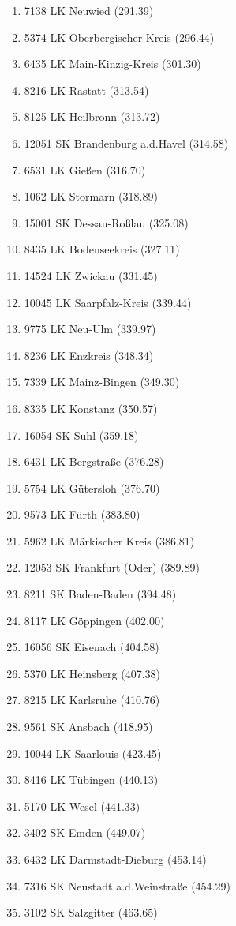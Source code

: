 \begin{enumerate}[itemsep=-6mm]
\item 7138 LK Neuwied (291.39)
\item 5374 LK Oberbergischer Kreis (296.44)
\item 6435 LK Main-Kinzig-Kreis (301.30)
\item 8216 LK Rastatt (313.54)
\item 8125 LK Heilbronn (313.72)
\item 12051 SK Brandenburg a.d.Havel (314.58)
\item 6531 LK Gießen (316.70)
\item 1062 LK Stormarn (318.89)
\item 15001 SK Dessau-Roßlau (325.08)
\item 8435 LK Bodenseekreis (327.11)
\item 14524 LK Zwickau (331.45)
\item 10045 LK Saarpfalz-Kreis (339.44)
\item 9775 LK Neu-Ulm (339.97)
\item 8236 LK Enzkreis (348.34)
\item 7339 LK Mainz-Bingen (349.30)
\item 8335 LK Konstanz (350.57)
\item 16054 SK Suhl (359.18)
\item 6431 LK Bergstraße (376.28)
\item 5754 LK Gütersloh (376.70)
\item 9573 LK Fürth (383.80)
\item 5962 LK Märkischer Kreis (386.81)
\item 12053 SK Frankfurt (Oder) (389.89)
\item 8211 SK Baden-Baden (394.48)
\item 8117 LK Göppingen (402.00)
\item 16056 SK Eisenach (404.58)
\item 5370 LK Heinsberg (407.38)
\item 8215 LK Karlsruhe (410.76)
\item 9561 SK Ansbach (418.95)
\item 10044 LK Saarlouis (423.45)
\item 8416 LK Tübingen (440.13)
\item 5170 LK Wesel (441.33)
\item 3402 SK Emden (449.07)
\item 6432 LK Darmstadt-Dieburg (453.14)
\item 7316 SK Neustadt a.d.Weinstraße (454.29)
\item 3102 SK Salzgitter (463.65)

\end{enumerate}
